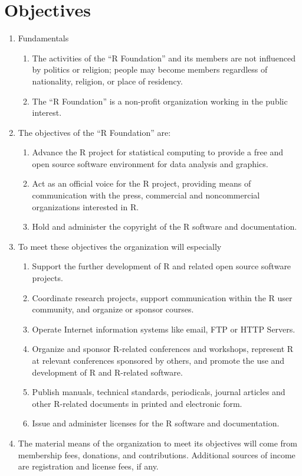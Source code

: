 \documentclass[a4paper]{article}
\newcommand{\RF}{``R Foundation''}
\begin{document}
\section{Objectives}

\begin{enumerate}
 \item Fundamentals
  \begin{enumerate}
   \item The activities of the \RF{} and its members are not
    influenced by politics or religion; people may become members
    regardless of nationality, religion, or place of residency.
   \item The \RF{} is a non-profit organization working in
    the public interest.
  \end{enumerate}
 \item The objectives of the \RF{} are:
  \begin{enumerate}
   \item Advance the R project for statistical computing to provide a
    free and open source software environment for data analysis and
    graphics. 
   \item Act as an official voice for the R project, providing means of
    communication with the press, commercial and noncommercial
    organizations interested in R.
   \item Hold and administer the copyright of the R software and
    documentation.
  \end{enumerate}

 \item To meet these objectives the organization will especially
  \begin{enumerate}
   \item Support the further development of R and related open source
    software projects.
   \item Coordinate research projects, support communication within
    the R user community, and organize or sponsor courses.
   \item Operate Internet information systems like email, FTP or HTTP
    Servers.
   \item Organize and sponsor R-related conferences and workshops,
    represent R at relevant conferences sponsored by others, and
    promote the use and development of R and R-related software.
   \item Publish manuals, technical standards, periodicals, journal
    articles and other R-related documents in printed and electronic
    form.
    \item Issue and administer licenses for the R software and
     documentation.
  \end{enumerate}
  
 \item The material means of the organization to meet its objectives
  will come from membership fees, donations, and contributions.
  Additional sources of income are registration and license fees, if
  any.
\end{enumerate}
\end{document}

